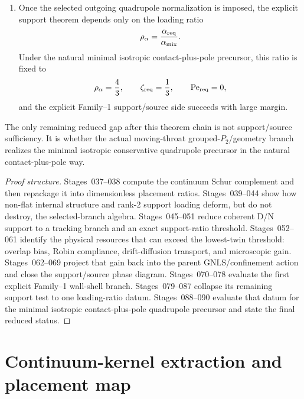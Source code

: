 \begin{theorem}
\begin{enumerate}[leftmargin=2.2em]
\begin{equation}
  \label{eq:part03-theorem-theta-j}
  \Theta_w^{(J)}\simeq0.927552032539308\,\lambda_\mu^2.
  \end{equation}
  \item Once the selected outgoing quadrupole normalization is imposed, the explicit support theorem depends only on the loading ratio
  \begin{equation}
  \label{eq:part03-theorem-rho-alpha}
  \rho_\alpha=\frac{\alpha_{\rm req}}{\alpha_{\rm mix}}.
  \end{equation}
  Under the natural minimal isotropic contact-plus-pole precursor, this ratio is fixed to
  \begin{equation}
  \label{eq:part03-theorem-minimal-ratio}
  \rho_\alpha=\frac43,
  \qquad
  \zeta_{\rm req}=\frac13,
  \qquad
  \mathrm{Pe}_{\rm req}=0,
  \end{equation}
  and the explicit Family--1 support/source side succeeds with large margin.
\end{enumerate}
The only remaining reduced gap after this theorem chain is not support/source sufficiency.  It is whether the actual moving-throat grouped-\(P_2\)/geometry branch realizes the minimal isotropic conservative quadrupole precursor in the natural contact-plus-pole way.
\end{theorem}

\begin{proof}[Proof structure]
Stages~037--038 compute the continuum Schur complement and then repackage it into dimensionless placement ratios.  Stages~039--044 show how non-flat internal structure and rank-2 support loading deform, but do not destroy, the selected-branch algebra.  Stages~045--051 reduce coherent D/N support to a tracking branch and an exact support-ratio threshold.  Stages~052--061 identify the physical resources that can exceed the lowest-twin threshold: overlap bias, Robin compliance, drift-diffusion transport, and microscopic gain.  Stages~062--069 project that gain back into the parent GNLS/confinement action and close the support/source phase diagram.  Stages~070--078 evaluate the first explicit Family--1 wall-shell branch.  Stages~079--087 collapse its remaining support test to one loading-ratio datum.  Stages~088--090 evaluate that datum for the minimal isotropic contact-plus-pole quadrupole precursor and state the final reduced status.
\end{proof}

\section{Continuum-kernel extraction and placement map}
\label{sec:part03_support_family1:continuum-kernel-extraction}


